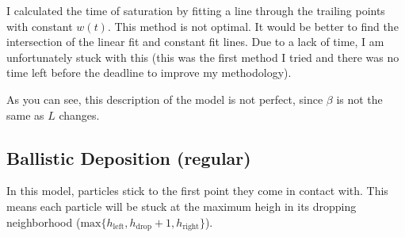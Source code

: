 \documentclass[12pt,a4paper]{article}
\begin{document}
    I calculated the time of saturation by fitting a line through the trailing points with constant $w(t)$.
    This method is not optimal. It would be better to find the intersection of the linear fit and constant fit lines.
    Due to a lack of time, I am unfortunately stuck with this (this was the first method I tried and there was no time
    left before the deadline to improve my methodology).

    As you can see, this description of the model is not perfect, since $\beta$ is not the same as $L$ changes.
    \subsection{Ballistic Deposition (regular)}
    In this model, particles stick to the first point they come in contact with. This means each particle will be stuck
    at the maximum heigh in its dropping neighborhood
    ($\text{max}\{h_{\text{left}}, h_{\text{drop}} + 1, h_{\text{right}}\}$).
\end{document}
